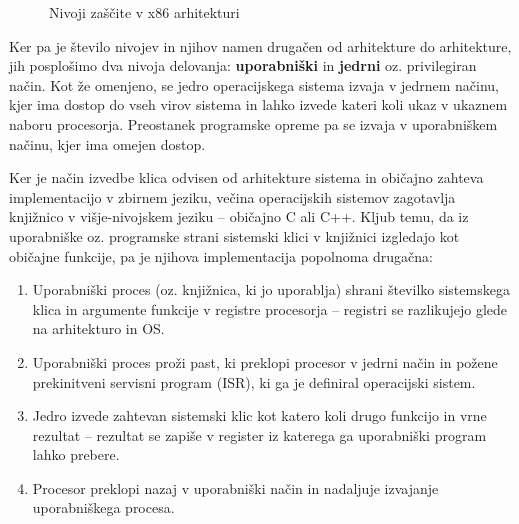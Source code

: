 \documentclass[a4paper,12pt,openright]{book}
\begin{document}
\begin{figure}[h!]
	\begin{center}
	\end{center}
	\caption{Nivoji zaščite v x86 arhitekturi\cite{Intel_2024}}
	\label{fig:privilege_levels_x86}
\end{figure}

Ker pa je število nivojev in njihov namen drugačen od arhitekture do arhitekture, jih posplošimo dva nivoja delovanja: \textbf{uporabniški} in \textbf{jedrni} oz. privilegiran način.
Kot že omenjeno, se jedro operacijskega sistema izvaja v jedrnem načinu, kjer ima dostop do vseh virov sistema in lahko izvede kateri koli ukaz v ukaznem naboru procesorja.
Preostanek programske opreme pa se izvaja v uporabniškem načinu, kjer ima omejen dostop.
\cite{Tanenbaum_Bos_2023}

Ker je način izvedbe klica odvisen od arhitekture sistema in običajno zahteva implementacijo v zbirnem jeziku, večina operacijskih sistemov zagotavlja knjižnico v višje-nivojskem jeziku -- običajno C ali C++.
Kljub temu, da iz uporabniške oz. programske strani sistemski klici v knjižnici izgledajo kot običajne funkcije, pa je njihova implementacija popolnoma drugačna:
\begin{enumerate}
	\item Uporabniški proces (oz. knjižnica, ki jo uporablja) shrani številko sistemskega klica in argumente funkcije v registre procesorja -- registri se razlikujejo glede na arhitekturo in OS.
	\item Uporabniški proces proži past, ki preklopi procesor v jedrni način in požene prekinitveni servisni program (ISR), ki ga je definiral operacijski sistem.
	\item Jedro izvede zahtevan sistemski klic kot katero koli drugo funkcijo in vrne rezultat -- rezultat se zapiše v register iz katerega ga uporabniški program lahko prebere.
	\item Procesor preklopi nazaj v uporabniški način in nadaljuje izvajanje uporabniškega procesa.\cite{Tanenbaum_Bos_2023}
\end{enumerate}
\end{document}
